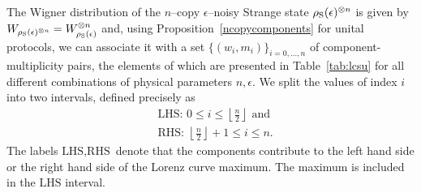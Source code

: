 \documentclass[pra,
aps,
twocolumn,
superscriptaddress,
groupedaddress,
nofootinbib,
reprint
]{revtex4-1}
\begin{document}
The Wigner distribution of the $n$--copy $\epsilon$--noisy Strange state $\rho_{\rm{S}}(\epsilon)^{\otimes n}$ is given by $\W{\rho_{\rm{S}}(\epsilon)^{\otimes n}} = W_{\rho_{\rm{S}}(\epsilon)}^{\otimes n}$ and, using Proposition~\ref{ncopycomponents} for unital protocols, we can associate it with a set $\{(w_i, m_i)\}_{i=0,\dots,n}$ of component-multiplicity pairs, the elements of which are presented in Table~\ref{tab:lcsu} for all different combinations of physical parameters $n, \epsilon$.
We split the values of index $i$ into two intervals, defined precisely as
\begin{align}
&\text{LHS: } 0 \leq i \leq \left\lfloor \frac{n}{2} \right\rfloor \text{ and} \\
&\text{RHS: } \left\lfloor \frac{n}{2} \right\rfloor +1 \leq i \leq n.
\end{align}
The labels $\text{LHS}, \text{RHS}$ denote that the components contribute to the left hand side or the right hand side of the Lorenz curve maximum.
The maximum is included in the $\text{LHS}$ interval.
\end{document}

